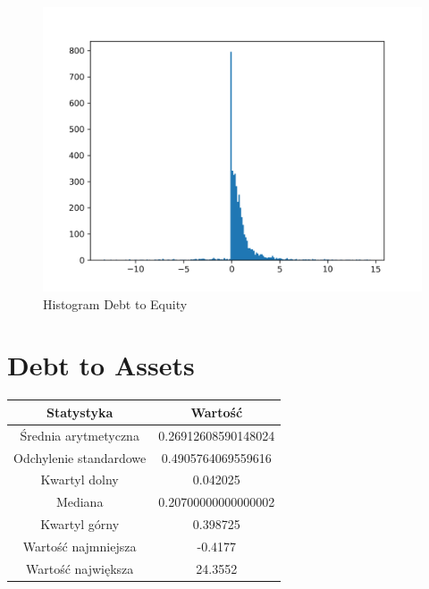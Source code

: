 \documentclass{article}
\begin{document}
\begin{figure}[h!]
    \includegraphics[width=\linewidth]{variables/Debt to Equity.png}
    \caption{Histogram Debt to Equity }
\end{figure}\section{ Debt to Assets }

\begin{center}
    \begin{tabular}{|c | c|} 
    \hline
    Statystyka & Wartość \\
    \hline\hline
    Średnia arytmetyczna & 0.26912608590148024 \\ 
    \hline
    Odchylenie standardowe & 0.4905764069559616 \\
    \hline
    Kwartyl dolny & 0.042025 \\
    \hline
    Mediana & 0.20700000000000002 \\
    \hline
    Kwartyl górny & 0.398725 \\
    \hline
    Wartość najmniejsza & -0.4177 \\
    \hline
    Wartość największa & 24.3552 \\
    \hline
   \end{tabular}
\end{center}
\end{document}
